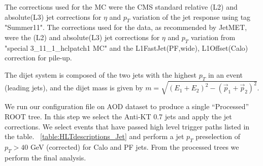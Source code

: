 The corrections used for the MC were the CMS standard relative
(L2) and absolute(L3) jet corrections for $\eta$ and $p_T$ variation
of the jet response using tag "Summer11". 
The corrections used for the data, as recommended by JetMET, were the (L2) and absolute(L3) jet 
corrections for $\eta$ and $p_T$ variation from "special 3\_11\_1\_hclpatch1 MC" and the L1FastJet(PF,wide), L1Offset(Calo)
correction for pile-up.


The dijet system is composed of the two jets with the highest $p_T$ in
an event (leading jets), and the dijet mass is given by $m=\sqrt{(E_1
+ E_2)^2 - (\vec{p}_1 + \vec{p}_2)^2}$.

We run our configuration file on AOD dataset to produce a single
``Processed'' ROOT tree. In this step we select the Anti-KT 0.7 jets
and apply the jet corrections.  We select events that have passed 
high level trigger paths listed in the table. ~\ref{table:HLTdescriptions_Jet} and perform a
jet $p_T$ preselection of $p_T>40$ GeV (corrected) for Calo and PF jets.  From the
processed trees we perform the final analysis.

